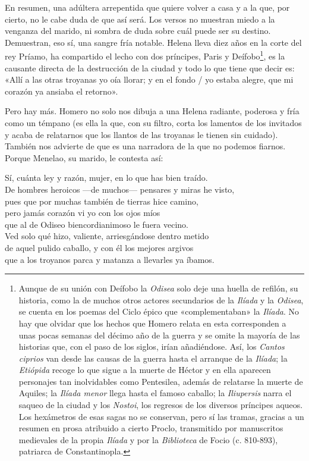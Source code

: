 En resumen, una adúltera arrepentida que quiere volver a casa y a la que, por cierto, no le cabe duda de que así será. Los versos no muestran miedo a la venganza del marido, ni sombra de duda sobre cuál puede ser su destino. Demuestran, eso sí, una sangre fría notable. Helena lleva diez años en la corte del rey Príamo, ha compartido el lecho con dos príncipes, Paris y Deífobo\footnote{Aunque de su unión con Deífobo la \emph{Odisea} solo deje una huella de refilón, su historia, como la de muchos otros actores secundarios de la \emph{Ilíada} y la \emph{Odisea}, se cuenta en los poemas del Ciclo épico que «complementaban» la \emph{Ilíada}. No hay que olvidar que los hechos que Homero relata en esta corresponden a unas pocas semanas del décimo año de la guerra y se omite la mayoría de las historias que, con el paso de los siglos, irían añadiéndose. Así, los \emph{Cantos ciprios} van desde las causas de la guerra hasta el arranque de la \emph{Ilíada}; la \emph{Etiópida} recoge lo que sigue a la muerte de Héctor y en ella aparecen personajes tan inolvidables como Pentesilea, además de relatarse la muerte de Aquiles; la \emph{Ilíada menor} llega hasta el famoso caballo; la \emph{Iliupersis} narra el saqueo de la ciudad y los \emph{Nostoi}, los regresos de los diversos príncipes aqueos. Los hexámetros de esas sagas no se conservan, pero sí las tramas, gracias a un resumen en prosa atribuido a cierto Proclo, transmitido por manuscritos medievales de la propia \emph{Ilíada} y por la \emph{Biblioteca} de Focio (c. 810-893), patriarca de Constantinopla.}, es la causante directa de la destrucción de la ciudad y todo lo que tiene que decir es: «Allí a las otras troyanas yo oía llorar; y en el fondo / yo estaba alegre, que mi corazón ya ansiaba el retorno».

Pero hay más. Homero no solo nos dibuja a una Helena radiante, poderosa y fría como un témpano (es ella la que, con su filtro, corta los lamentos de los invitados y acaba de relatarnos que los llantos de las troyanas le tienen sin cuidado). También nos advierte de que es una narradora de la que no podemos fiarnos. Porque Menelao, su marido, le contesta así:

\begin{versocita}
Sí, cuánta ley y razón, mujer, en lo que has bien traído.\\
De hombres heroicos ---de muchos--- pensares y miras he visto,\\
pues que por muchas también de tierras hice camino,\\
pero jamás corazón vi yo con los ojos míos\\
que al de Odiseo biencordianimoso le fuera vecino.\\
Ved solo qué hizo, valiente, arriesgándose dentro metido\\
de aquel pulido caballo, y con él los mejores argivos\\
que a los troyanos parca y matanza a llevarles ya íbamos.
\end{versocita}

